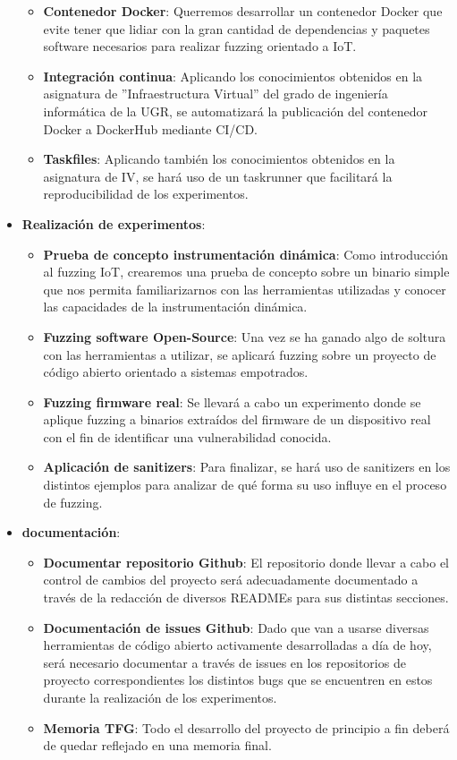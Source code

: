 \begin{itemize}
\begin{itemize}
        \item \textbf{Contenedor Docker}: Querremos desarrollar un contenedor Docker que evite tener que lidiar con la gran cantidad de dependencias 
        y paquetes software necesarios para realizar fuzzing orientado a IoT.
        \item \textbf{Integración continua}: Aplicando los conocimientos obtenidos en la asignatura de ''Infraestructura Virtual'' del grado de
        ingeniería informática de la UGR, se automatizará la publicación del contenedor Docker a DockerHub mediante CI/CD.
        \item \textbf{Taskfiles}: Aplicando también los conocimientos obtenidos en la asignatura de IV, se hará uso de un taskrunner que 
        facilitará la reproducibilidad de los experimentos. 
    \end{itemize}
    \item \textbf{Realización de experimentos}:
    \begin{itemize}
        \item \textbf{Prueba de concepto instrumentación dinámica}: Como introducción al fuzzing IoT, crearemos una prueba de concepto sobre
        un binario simple que nos permita familiarizarnos con las herramientas utilizadas y conocer las capacidades de la instrumentación dinámica.
        \item \textbf{Fuzzing software Open-Source}: Una vez se ha ganado algo de soltura con las herramientas a utilizar, se aplicará fuzzing 
        sobre un proyecto de código abierto orientado a sistemas empotrados.
        \item \textbf{Fuzzing firmware real}: Se llevará a cabo un experimento donde se aplique fuzzing a binarios extraídos del firmware de un 
        dispositivo real con el fin de identificar una vulnerabilidad conocida. 
        \item \textbf{Aplicación de sanitizers}: Para finalizar, se hará uso de sanitizers en los distintos ejemplos para analizar de qué forma 
        su uso influye en el proceso de fuzzing.
    \end{itemize}
    \item \textbf{documentación}:
    \begin{itemize}
        \item \textbf{Documentar repositorio Github}: El repositorio donde llevar a cabo el control de cambios del proyecto será 
        adecuadamente documentado a través de la redacción de diversos READMEs para sus distintas secciones.
        \item \textbf{Documentación de issues Github}: Dado que van a usarse diversas herramientas de código abierto activamente 
        desarrolladas a día de hoy, será necesario documentar a través de issues en los repositorios de proyecto correspondientes
        los distintos bugs que se encuentren en estos durante la realización de los experimentos.
        \item \textbf{Memoria TFG}: Todo el desarrollo del proyecto de principio a fin deberá de quedar reflejado en una memoria final.
    \end{itemize}
\end{itemize}

